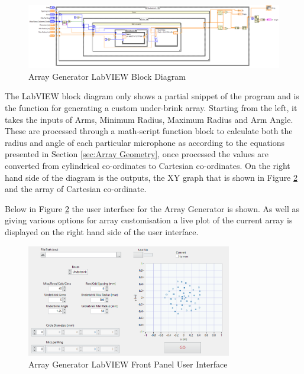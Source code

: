 \documentclass{UoNMCHA}
\numberwithin{equation}{section}
\begin{document}
    \begin{figure}[H]
        \centering
        \includegraphics[keepaspectratio, width = \textwidth]{Figures/ArrayGenBlock.png}
        \caption{Array Generator LabVIEW Block Diagram}
        \label{fig:ArrayGenBlock}
    \end{figure}
    
    The LabVIEW block diagram only shows a partial snippet of the program and is the function for generating a custom under-brink array. Starting from the left, it takes the inputs of Arms, Minimum Radius, Maximum Radius and Arm Angle. These are processed through a math-script function block to calculate both the radius and angle of each particular microphone as according to the equations presented in Section \ref{sec:Array Geometry}, once processed the values are converted from cylindrical co-ordinates to Cartesian co-ordinates. On the right hand side of the diagram is the outputs, the XY graph that is shown in Figure \ref{fig:ArrayGenPanel} and the array of Cartesian co-ordinate.
    
    Below in Figure \ref{fig:ArrayGenPanel} the user interface for the Array Generator is shown. As well as giving various options for array customisation a live plot of the current array is displayed on the right hand side of the user interface.  
    
    \begin{figure}[H]
        \centering
        \includegraphics[keepaspectratio, width = 0.8\textwidth]{Figures/ArrayGenPanel.png}
        \caption{Array Generator LabVIEW Front Panel User Interface}
        \label{fig:ArrayGenPanel}
    \end{figure}
    
\end{document}
